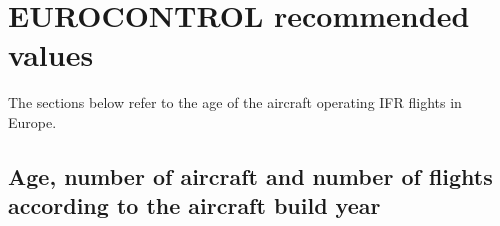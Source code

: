 \documentclass[
  11pt,
  a4paper,
]{book}
\begin{document}
\hypertarget{eurocontrol-recommended-values-22}{%
\section{EUROCONTROL recommended
values}\label{eurocontrol-recommended-values-22}}

The sections below refer to the age of the aircraft operating IFR
flights in Europe.

\hypertarget{age-number-of-aircraft-and-number-of-flights-according-to-the-aircraft-build-year}{%
\subsection{Age, number of aircraft and number of flights according to
the aircraft build
year}\label{age-number-of-aircraft-and-number-of-flights-according-to-the-aircraft-build-year}}
\end{document}
